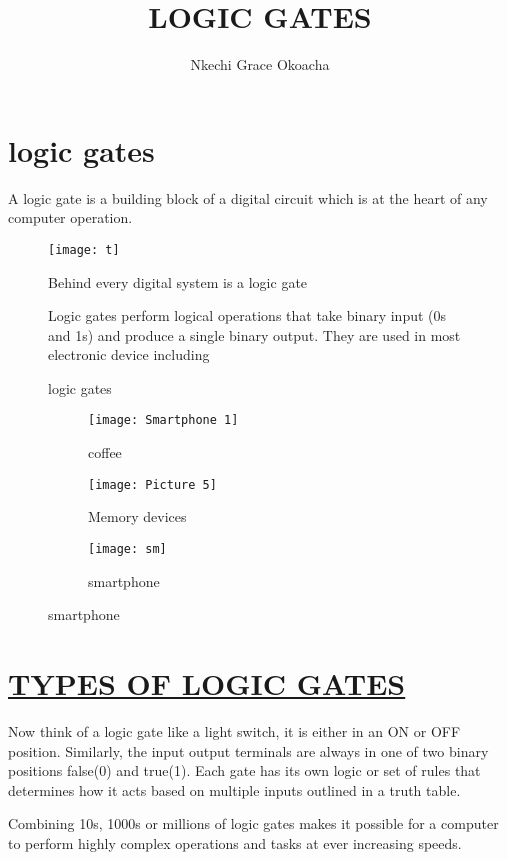\documentclass{article}
\begin{document}
		\author{Nkechi Grace Okoacha}
	\title{LOGIC GATES}
	\maketitle
	\newpage
	\tableofcontents
	\newpage
\section{logic gates}	
A logic gate is a building block of a digital circuit which is at the heart of any computer operation.

\begin{figure}[h!]
	\texttt{[image: t]}
	\caption{logic gates}

Behind every digital system is a logic gate



Logic gates perform logical operations that take binary input (0s and 1s) and produce  a single binary output. They are used in most electronic device including
\end{figure}

\begin{figure}[h!]
	\centering
	\begin{subfigure}[b]{0.2\linewidth}
		
		\texttt{[image: Smartphone 1]}
		\caption{coffee}\end{subfigure}
	\begin{subfigure}[b]{0.2\linewidth}
		\texttt{[image: Picture 5]}
		\caption{Memory devices}
	\end{subfigure}
	\begin{subfigure}[b]{0.2\linewidth}
		\texttt{[image: sm]}
		\caption{smartphone}
	\end{subfigure}
\end{figure}


 \section{\textbf\underline{TYPES OF LOGIC GATES}}
Now think of a logic gate like a light switch, it is either in an ON or OFF position. Similarly, the input output terminals are always in one of two binary positions false(0) and true(1). Each gate has its own logic or set of rules that determines how it acts based on multiple inputs outlined in a truth table.

Combining 10s, 1000s or millions of logic gates makes it possible for a computer to perform highly complex operations and tasks at ever increasing speeds.
\end{document}
